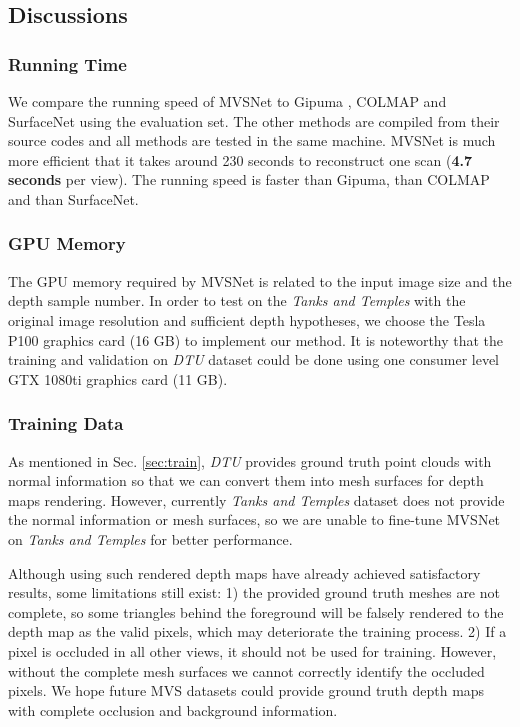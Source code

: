 \documentclass[runningheads]{llncs}
\begin{document}
\subsection{Discussions}

\subsubsection{Running Time}
We compare the running speed of MVSNet to Gipuma \cite{galliani2015massively}, COLMAP \cite{schonberger2016pixelwise} and SurfaceNet \cite{ji2017surfacenet} using the  evaluation set. The other methods are compiled from their source codes and all methods are tested in the same machine. MVSNet is much more efficient that it takes around 230 seconds to reconstruct one scan (\textbf{4.7 seconds} per view). The running speed is  faster than Gipuma,  than COLMAP and  than SurfaceNet. 

\vspace{-3mm}
\subsubsection{GPU Memory}
The GPU memory required by MVSNet is related to the input image size and the depth sample number. In order to test on the \textit{Tanks and Temples} with the original image resolution and sufficient depth hypotheses, we choose the Tesla P100 graphics card (16 GB) to implement our method. It is noteworthy that the training and validation on \textit{DTU} dataset could be done using one consumer level GTX 1080ti graphics card (11 GB).

\vspace{-3mm}
\subsubsection{Training Data}
As mentioned in Sec. \ref{sec:train}, \textit{DTU} provides ground truth point clouds with normal information so that we can convert them into mesh surfaces for depth maps rendering. However, currently \textit{Tanks and Temples} dataset does not provide the normal information or mesh surfaces, so we are unable to fine-tune MVSNet on \textit{Tanks and Temples} for better performance. 

Although using such rendered depth maps have already achieved satisfactory results, some limitations still exist: 1) the provided ground truth meshes are not  complete, so some triangles behind the foreground will be falsely rendered to the depth map as the valid pixels, which may deteriorate the training process. 2) If a pixel is occluded in all other views, it should not be used for training. However, without the complete mesh surfaces we cannot correctly identify the occluded pixels. We hope future MVS datasets could provide ground truth depth maps with complete occlusion and background information.
\end{document}
